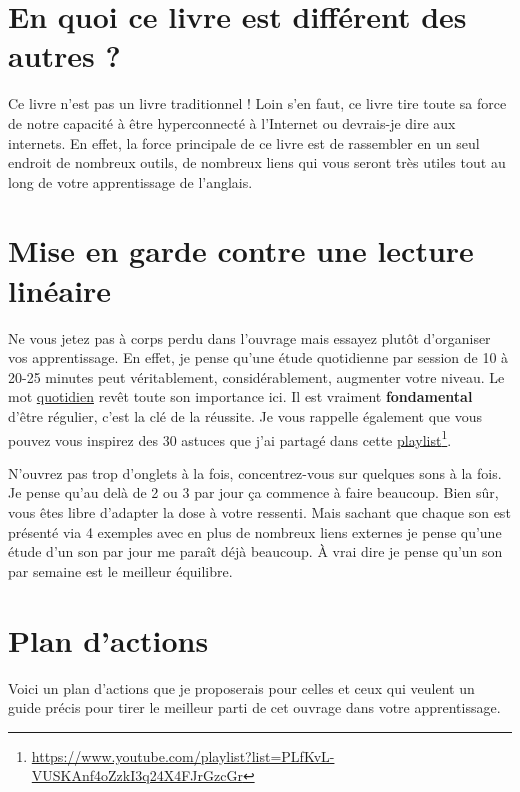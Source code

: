 \section{En quoi ce livre est différent des autres ?}\label{sec:diff}

Ce livre n'est pas un livre traditionnel ! Loin s'en faut, ce livre
tire toute sa force de notre capacité à être hyperconnecté à
l'Internet ou devrais-je dire aux internets. En effet, la force
principale de ce livre est de rassembler en un seul endroit de
nombreux outils, de nombreux liens qui vous seront très utiles tout au
long de votre apprentissage de l'anglais.

\section{Mise en garde contre une lecture linéaire}\label{sec:lin}

Ne vous jetez pas à corps perdu dans l'ouvrage mais essayez plutôt
d'organiser vos apprentissage. En effet, je pense qu'une étude
quotidienne par session de 10 à 20-25 minutes peut véritablement,
considérablement, augmenter votre niveau. Le mot \underline{quotidien}
revêt toute son importance ici. Il est vraiment \textbf{fondamental}
d'être régulier, c'est la clé de la réussite. Je vous rappelle
également que vous pouvez vous inspirez des 30 astuces que j'ai
partagé dans cette \href{https://www.youtube.com/playlist?list=PLfKvL-VUSKAnf4oZzkI3q24X4FJrGzcGr}{playlist}\footnote{\url{https://www.youtube.com/playlist?list=PLfKvL-VUSKAnf4oZzkI3q24X4FJrGzcGr}}.

N'ouvrez pas trop d'onglets à la fois, concentrez-vous sur quelques
sons à la fois. Je pense qu'au delà de 2 ou 3 par jour ça commence à
faire beaucoup. Bien sûr, vous êtes libre d'adapter la dose à votre
ressenti. Mais sachant que chaque son est présenté via 4 exemples avec
en plus de nombreux liens externes je pense qu'une étude d'un son par
jour me paraît déjà beaucoup. À vrai dire je pense qu'un son par
semaine est le meilleur équilibre.

\section{Plan d'actions}\label{sec:plan}

Voici un plan d'actions que je proposerais pour celles et ceux qui
veulent un guide précis pour tirer le meilleur parti de cet ouvrage
dans votre apprentissage.

